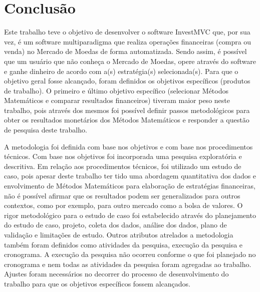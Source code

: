 \chapter{Conclusão}
\label{sec:conclusao}

Este trabalho teve o objetivo de desenvolver o software InvestMVC que, por sua vez, é um software multiparadigma que realiza operações financeiras (compra ou venda) no Mercado de Moedas de forma automatizada. Sendo assim, é possível que um usuário que não conheça o Mercado de Moedas, opere através do software e ganhe dinheiro de acordo com a(s) estratégia(s) selecionada(s). Para que o objetivo geral fosse alcançado, foram definidos os objetivos específicos (produtos de trabalho). O primeiro e último objetivo específico (selecionar Métodos Matemáticos e comparar resultados financeiros) tiveram maior peso neste trabalho, pois através dos mesmos foi possível definir passos metodológicos para obter os resultados monetários dos Métodos Matemáticos e responder a questão de pesquisa deste trabalho.

A metodologia foi definida com base nos objetivos e com base nos procedimentos técnicos. Com base nos objetivos foi incorporada uma pesquisa exploratória e descritiva. Em relação aos procedimentos técnicos, foi utilizado um estudo de caso, pois apesar deste trabalho ter tido uma abordagem quantitativa dos dados e envolvimento de Métodos Matemáticos para elaboração de estratégias financeiras, não é possível afirmar que os resultados podem ser generalizados para outros contextos, como por exemplo, para outro mercado como a bolsa de valores. O rigor metodológico para o estudo de caso foi estabelecido através do planejamento do estudo de caso, projeto, coleta dos dados, análise dos dados, plano de validação e limitações de estudo. Outros atributos atrelados a metodologia também foram definidos como atividades da pesquisa, execução da pesquisa e cronograma. A execução da pesquisa não ocorreu conforme o que foi planejado no cronograma e nem todas as atividades da pesquisa foram agregadas ao trabalho. Ajustes foram necessários no decorrer do processo de desenvolvimento do trabalho para que os objetivos específicos fossem alcançados.

